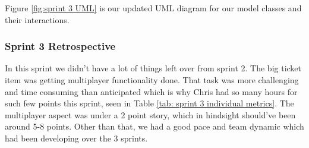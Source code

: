 \noindent Figure \ref{fig:sprint 3 UML} is our updated UML diagram for our model classes and their interactions.


\subsubsection{Sprint 3 Retrospective}
In this sprint we didn't have a lot of things left over from sprint 2. The big ticket item was getting multiplayer functionality done. That task was more challenging and time consuming than anticipated which is why Chris had so many hours for such few points this sprint, seen in Table \ref{tab: sprint 3 individual metrics}. The multiplayer aspect was under a 2 point story, which in hindsight should've been around 5-8 points. Other than that, we had a good pace and team dynamic which had been developing over the 3 sprints.


